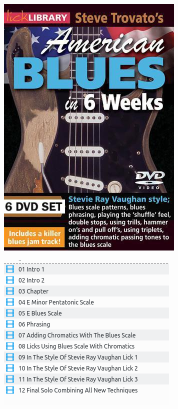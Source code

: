 \documentclass[a4paper]{book}
\begin{document}
\begin{center}
\includegraphics[width=8.996cm,height=13.044cm]{lebluessupportsmethodes-img117.jpg}
\end{center}





\begin{center}
\includegraphics[width=8.729cm,height=7.671cm]{lebluessupportsmethodes-img118.png}
\end{center}






\clearpage
\end{document}
